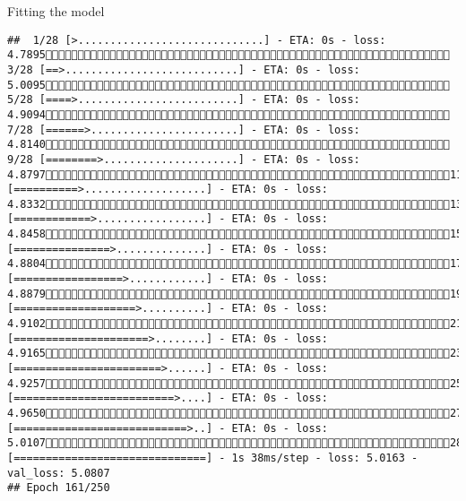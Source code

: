 \documentclass[
  ignorenonframetext,
]{beamer}
\begin{document}
\begin{frame}[fragile]{Fitting the model}
\begin{verbatim}
##  1/28 [>.............................] - ETA: 0s - loss: 4.7895 3/28 [==>...........................] - ETA: 0s - loss: 5.0095 5/28 [====>.........................] - ETA: 0s - loss: 4.9094 7/28 [======>.......................] - ETA: 0s - loss: 4.8140 9/28 [========>.....................] - ETA: 0s - loss: 4.879711/28 [==========>...................] - ETA: 0s - loss: 4.833213/28 [============>.................] - ETA: 0s - loss: 4.845815/28 [===============>..............] - ETA: 0s - loss: 4.880417/28 [=================>............] - ETA: 0s - loss: 4.887919/28 [===================>..........] - ETA: 0s - loss: 4.910221/28 [=====================>........] - ETA: 0s - loss: 4.916523/28 [=======================>......] - ETA: 0s - loss: 4.925725/28 [=========================>....] - ETA: 0s - loss: 4.965027/28 [===========================>..] - ETA: 0s - loss: 5.010728/28 [==============================] - 1s 38ms/step - loss: 5.0163 - val_loss: 5.0807
## Epoch 161/250

\end{verbatim}
\end{frame}
\end{document}

